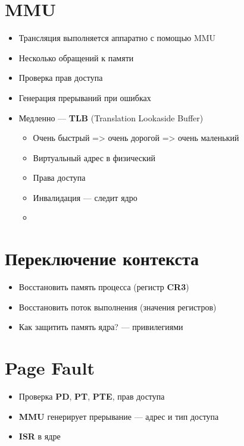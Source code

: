 \documentclass[../../lectures.tex]{subfiles}
\begin{document}
\section{MMU}
\begin{itemize}
    \item Трансляция выполняется аппаратно с помощью MMU
    \item Несколько обращений к памяти
    \item Проверка прав доступа
    \item Генерация прерываний при ошибках
    \item Медленно --- \textbf{TLB} (Translation Lookaside Buffer)
          \begin{itemize}
            \item Очень быстрый => очень дорогой => очень маленький
            \item Виртуальный адрес в физический
            \item Права доступа
            \item Инвалидация --- следит ядро
            \item {}
          \end{itemize}
\end{itemize}

\section{Переключение контекста}
\begin{itemize}
    \item Восстановить память процесса (регистр \textbf{CR3})
    \item Восстановить поток выполнения (значения регистров)
    \item Как защитить память ядра? --- привилегиями
\end{itemize}

\section{Page Fault}
\begin{itemize}
    \item Проверка \textbf{PD}, \textbf{PT}, \textbf{PTE}, прав доступа
    \item \textbf{MMU} генерирует прерывание --- адрес и тип доступа
    \item \textbf{ISR} в ядре
\end{itemize}
\end{document}
